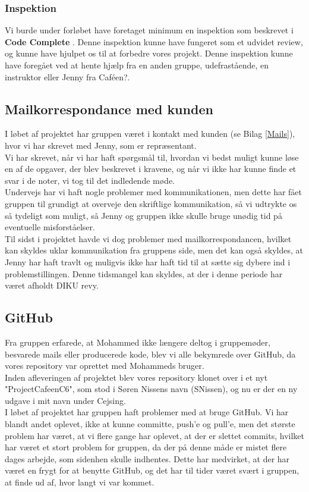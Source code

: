 \documentclass[]{article}
\begin{document}
\subsubsection{Inspektion}
\noindent Vi burde under forløbet have foretaget minimum en inspektion som beskrevet i \textbf{Code Complete} \cite{mcconnell2004code}. Denne inspektion kunne have fungeret som et udvidet review, og kunne have hjulpet os til at forbedre vores projekt. Denne inspektion kunne have foregået ved at hente hjælp fra en anden gruppe, udefrastående, en instruktor eller Jenny fra Caféen?.

\subsection{Mailkorrespondance med kunden}
I løbet af projektet har gruppen været i kontakt med kunden (se Bilag \ref{Mails}), hvor vi har skrevet med Jenny, som er repræsentant. \\
Vi har skrevet, når vi har haft spørgsmål til, hvordan vi bedst muligt kunne løse en af de opgaver, der blev beskrevet i kravene, og når vi ikke har kunne finde et svar i de noter, vi tog til det indledende møde. \\
Undervejs har vi haft nogle problemer med kommunikationen, men dette har fået gruppen til grundigt at overveje den skriftlige kommunikation, så vi udtrykte os så tydeligt som muligt, så Jenny og gruppen ikke skulle bruge unødig tid på eventuelle misforståelser. \\
Til sidst i projektet havde vi dog problemer med mailkorrespondancen, hvilket kan skyldes uklar kommunikation fra gruppens side, men det kan også skyldes, at Jenny har haft travlt og muligvis ikke har haft tid til at sætte sig dybere ind i problemstillingen. Denne tidsmangel kan skyldes, at der i denne periode har været afholdt DIKU revy.

\subsection{GitHub}
Fra gruppen erfarede, at Mohammed ikke længere deltog i gruppemøder, besvarede mails eller producerede kode, blev vi alle bekymrede over GitHub, da vores repository var oprettet med Mohammeds bruger. \\
Inden afleveringen af projektet blev vores repository klonet over i et nyt "ProjectCafeenC6", som stod i Søren Nissens navn (SNissen), og nu er der en ny udgave i mit navn under Cejsing.\\
\indent I løbet af projektet har gruppen haft problemer med at bruge GitHub. Vi har blandt andet oplevet, ikke at kunne committe, push'e og pull'e, men det største problem har været, at vi flere gange har oplevet, at der er slettet commits, hvilket har været et stort problem for gruppen, da der på denne måde er mistet flere dages arbejde, som sidenhen skulle indhentes. Dette har medvirket, at der har været en frygt for at benytte GitHub, og det har til tider været svært i gruppen, at finde ud af, hvor langt vi var kommet.
\end{document}
